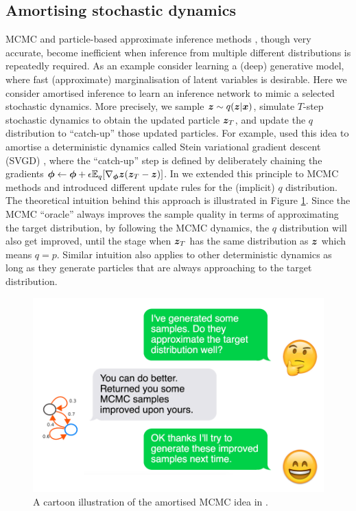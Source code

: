 \subsection{Amortising stochastic dynamics}
MCMC and particle-based approximate inference methods \citep{dai:pmd2015, liu:svgd2016}, though very accurate, become inefficient when inference from multiple different distributions is repeatedly required. As an example consider learning a (deep) generative model, where fast (approximate) marginalisation of latent variables is desirable. Here we consider amortised inference to learn an inference network to mimic a selected stochastic dynamics. More precisely, we sample $\bm{z} \sim q(\bm{z}|\bm{x})$, simulate $T$-step stochastic dynamics to obtain the updated particle $\bm{z}_{T}$, and update the $q$ distribution to ``catch-up'' those updated particles. For example, \cite{wang:amortisedsvgd2016} used this idea to amortise a deterministic dynamics called Stein variational gradient descent (SVGD) \citep{liu:svgd2016}, where the ``catch-up'' step is defined by deliberately chaining the gradients $\bm{\phi} \leftarrow \bm{\phi} + \epsilon \mathbb{E}_{q} [ \nabla_{\bm{\phi}} \bm{z} (\bm{z}_T - \bm{z}) ] $. In  \citet{li:amcmc2017} we extended this principle to MCMC methods and introduced different update rules for the (implicit) $q$ distribution. The theoretical intuition behind this approach is illustrated in Figure \ref{fig:chap5_amc_cartoon}. Since the MCMC ``oracle'' always improves the sample quality in terms of approximating the target distribution, by following the MCMC dynamics, the $q$ distribution will also get improved, until the stage when $\bm{z}_T$ has the same distribution as $\bm{z}$ which means $q = p$. Similar intuition also applies to other deterministic dynamics as long as they generate particles that are always approaching to the target distribution.

\begin{figure}
\centering
\includegraphics[width=0.6\linewidth]{Chapter5/amccartoon.png}
\caption{A cartoon illustration of the amortised MCMC idea in \cite{li:amcmc2017}. }
\label{fig:chap5_amc_cartoon}
\end{figure}

